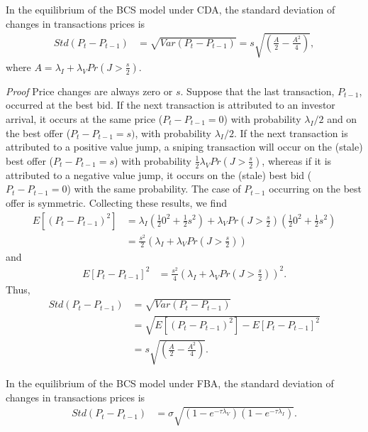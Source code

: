 \documentclass[12pt]{article}
\begin{document}
\begin{appendices}
\begin{proposition} \label{stdDeltaPCDA}
In the equilibrium of the BCS model under CDA, the standard deviation of changes in transactions prices is
\begin{align}
Std(P_t-P_{t-1}) & = \sqrt{Var\left(P_{t}-P_{t-1}\right)}  = s \sqrt{\left(\frac{A}{2}-\frac{A^{2}}{4}\right)}, \label{dPCDA}
\end{align}
where $A=\lambda_{I}+\lambda_{V}Pr(J>\frac{s}{2})$.
\end{proposition}

\noindent \emph{Proof} Price changes are always zero or $s$.  Suppose that the last transaction, $P_{t-1}$, occurred at the best bid. If the next transaction is attributed to an investor arrival, it occurs at the same price ($P_t-P_{t-1} = 0$) with probability $\lambda_I/2$ and on the best offer ($P_t-P_{t-1} = s)$, with probability $\lambda_I/2$. If the next transaction is attributed to a positive value jump, a sniping transaction will occur on the (stale) best offer ($P_t-P_{t-1}=s$) with probability $\frac{1}{2}\lambda_{V}Pr\left(J>\frac{s}{2}\right)$, whereas if it is attributed to a negative value jump, it occurs on the (stale) best bid ($P_t-P_{t-1}=0$) with the same probability. The case of $P_{t-1}$ occurring on the best offer is symmetric. Collecting these results, we find
\begin{align}
E\left[(P_{t}-P_{t-1})^{2}\right] & =\lambda_{I}\left(\frac{1}{2}0^{2}+\frac{1}{2}s^{2}\right)+\lambda_{V}Pr\left(J>\frac{s}{2}\right)\left(\frac{1}{2}0^{2}+\frac{1}{2}s^{2}\right) \nonumber \\
& =\frac{s^{2}}{2}\left(\lambda_{I}+\lambda_{V}Pr\left(J>\frac{s}{2}\right)\right) \label{pDiff}
\end{align}
and
\begin{align}
E\left[P_{t}-P_{t-1}\right]^{2} & =\frac{s^{2}}{4}\left(\lambda_{I}+\lambda_{V}Pr\left(J>\frac{s}{2}\right)\right)^{2}.
\end{align}
Thus,
\begin{align}
Std(P_t-P_{t-1}) & = \sqrt{Var\left(P_{t}-P_{t-1}\right)} \nonumber \\
& = \sqrt{E\left[(P_{t}-P_{t-1})^{2}\right]-E\left[P_{t}-P_{t-1}\right]^{2}} \nonumber \\
& = s \sqrt{\left(\frac{A}{2}-\frac{A^{2}}{4}\right)}. \label{varPDiff}
\end{align}

\begin{proposition} \label{stdDeltaPFBA}
In the equilibrium of the BCS model under FBA, the standard deviation of changes in transactions prices is
\begin{align}
Std\left(P_{t}-P_{t-1}\right) & = \sigma \sqrt{\left(1-e^{-\tau \lambda_V}\right) \left(1-e^{-\tau \lambda_I}\right)}. \label{dPFBA} 
\end{align}
\end{proposition}


\end{appendices}
\end{document}
